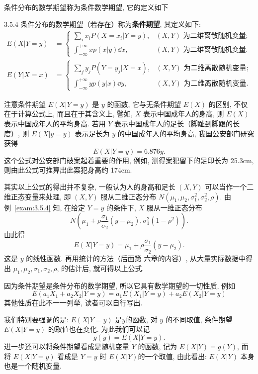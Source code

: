 	条件分布的数学期望称为条件数学期望,  它的定义如下
	\begin{definition}{}{3.5.4}
		条件分布的数学期望（若存在）称为\textbf{条件期望}, 其定义如下:
		\begin{align}
		E(X | Y=y)&=\begin{cases} \sum_{i} x_{i} P\left(X=x_{i} | Y=y\right), &(X,Y)\text{ 为二维离散随机变量};\\
			\int_{-\infty}^{+\infty} x p(x | y) \dd x,	& (X,Y) \text{ 为二维离散随机变量}.
			 \end{cases}\label{eq:3.5.15} \\
			E(Y | X=x)&=\begin{cases} \sum_{j} y_{j} P\left(Y=y_{j} | X=x\right), &(X,Y)\text{ 为二维离散随机变量};\\
			 \int_{-\infty}^{+\infty} y p(y | x) \dd y, &(X,Y)\text{ 为二维离散随机变量}.
			\end{cases}\label{eq:3.5.16}
		\end{align}
	\end{definition}
	注意条件期望 $E(X|Y=y)$ 是 $y$ 的函数, 它与无条件期望 $E(X)$ 的区别, 不仅在于计算公式上, 而且在于其含义上,
	譬如, $X$ 表示中国成年人的身高, 则 $E(X)$ 表示中国成年人的平均身高.
	若用 $Y$ 表示中国成年人的足长（脚趾到脚跟的长度）, 则 $E(X|y=y)$ 表示足长为 $y$ 的中国成年人的平均身高,
	我国公安部门研究获得
	\[
		E(X | Y=y)=6.876 y.
	\]
	这个公式对公安部门破案起着重要的作用, 例如, 测得案犯留下的足印长为 25.3cm,
	则由此公式可推算出此案犯身高约 174cm.
	
	其实以上公式的得出并不复杂,
	一般认为人的身高和足长 $(X,Y)$ 可以当作一个二维正态变量来处理,
	即 $(X,Y)$ 服从二维正态分布 $N(\mu_1,\mu_2,\sigma_1^2,\sigma_2^2,\rho)$. 由例~\ref{exam:3.5.4}
	知, 在给定 $Y=y$ 的条件下, $X$ 服从一维正态分布
	\[
		N\left(\mu_{1}+\rho \frac{\sigma_{1}}{\sigma_{2}}\left(y-\mu_{2}\right),
		 \sigma_{1}^{2}\left(1-\rho^{2}\right)\right).
	\]
	由此得
	\[
		E(X | Y=y)=\mu_{1}+\rho \frac{\sigma_{1}}{\sigma_{2}}\left(y-\mu_{2}\right).	
	\]
	这是 $y$ 的线性函数. 再用统计的方法（后面第
	六章的内容）, 从大量实际数据中得出 $\mu_1,\mu_2,\sigma_1,\sigma_2,\rho$, 的估计后, 就可得以上公式.

	因为条件期望是条件分布的数学期望, 所以它具有数学期望的一切性质, 例如
	\[
		E\left(a_{1} X_{1}+a_{2} X_{2} | Y=y\right)=a_{1} E\left(X_{1} | Y=y\right)+a_{2} E\left(X_{2} | Y=y\right)
	\]
	其他性质在此不一一列举, 读者可以自行写出.

	我们特别要强调的是: $E(X|Y=y)$ 是$y$的函数, 对 $y$ 的不同取值, 条件期望 $E(X|Y=y)$ 的取值也在变化.
	为此我们可以记
	\[
		g(y)=E(X | Y=y).
	\]
	进一步还可以将条件期望看成是随机变量 $Y$ 的函数, 记为 $E(X|Y)=g(Y)$, 而将 $E(X|Y=y)$
	看成是 $Y=y$ 时 $E(X|Y)$的一个取值, 由此看出: $E(X|Y)$ 本身也是一个随机变量.

